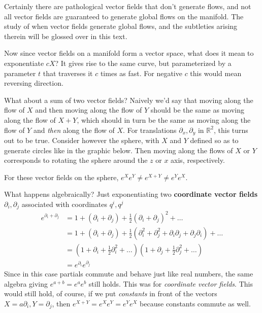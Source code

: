 		\begin{nb}
			Certainly there are pathological vector fields that don't generate flows, and not all vector fields are guaranteed to generate global flows on the manifold. The study of when vector fields generate global flows, and the subtleties arising therein will be glossed over in this text.
		\end{nb}
		
		Now since vector fields on a manifold form a vector space, what does it mean to exponentiate $c X$? It gives rise to the same curve, but parameterized by a parameter $t$ that traverses it $c$ times as fast. For negative $c$ this would mean reversing direction. 
		
		What about a sum of two vector fields? Naively we'd say that moving along the flow of $X$ and then moving along the flow of $Y$ should be the same as moving along the flow of $X+Y$, which should in turn be the same as moving along the flow of $Y$ and \emph{then} along the flow of $X$. For translations $\partial_x, \partial_y$ in $\mathbb R^2$, this turns out to be true. Consider however the sphere, with $X$ and $Y$ defined so as to generate circles like in the graphic below. Then moving along the flows of $X$ or $Y$ corresponds to rotating the sphere around the $z$ or $x$ axis, respectively. 
		
		
		For these vector fields on the sphere, $e^{X}e^{Y}\neq e^{X+Y} \neq e^Y e^X$. 
		
		What happens algebraically? Just exponentiating two \textbf{coordinate vector fields} $\partial_i, \partial_j$ associated with coordinates $q^i, q^j$
		\begin{align*}
			e^{\partial_i + \partial_j} &= 1 + (\partial_i + \partial_j) + \frac{1}{2}(\partial_i + \partial_j)^2 + \dots\\
			&= 1 + (\partial_i + \partial_j) + \frac{1}{2}(\partial_i^2 + \partial^2_j + \partial_i \partial_j + \partial_j \partial_i) + \dots\\
			&= (1+\partial_i + \frac{1}{2}\partial_i^2+\dots)(1+\partial_j + \frac{1}{2} \partial_j^2+\dots)\\
			&= e^{\partial_i} e^{\partial_j}
		\end{align*}
		Since in this case partials commute and behave just like real numbers, the same algebra giving $e^{a+b} = e^a e^b$ still holds. This was for \emph{coordinate vector fields}. This would still hold, of course, if we put \emph{constants} in front of the vectors $X = a \partial_i, Y=\partial_j$, then $e^{X+Y}=e^X e^Y = e^Y e^X$ because constants commute as well. 
		
